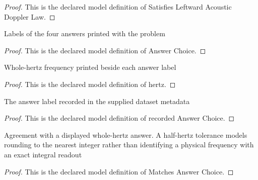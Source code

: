 \begin{proof}
  This is the declared model definition of Satisfies Leftward Acoustic Doppler Law.
\end{proof}
\begin{definition}
  \label{def:physics:phyx-mini-0195:phyxminiproblems-problemphyxmini0195-answerchoice}
  Labels of the four answers printed with the problem
\end{definition}
\begin{proof}
  This is the declared model definition of Answer Choice.
\end{proof}
\begin{definition}[hertz]
  \label{def:physics:phyx-mini-0195:phyxminiproblems-problemphyxmini0195-answerchoice-hertz}
  Whole-hertz frequency printed beside each answer label
\end{definition}
\begin{proof}
  This is the declared model definition of hertz.
\end{proof}
\begin{definition}
  \label{def:physics:phyx-mini-0195:phyxminiproblems-problemphyxmini0195-recordedanswerchoice}
  The answer label recorded in the supplied dataset metadata
\end{definition}
\begin{proof}
  This is the declared model definition of recorded Answer Choice.
\end{proof}
\begin{definition}
  \label{def:physics:phyx-mini-0195:phyxminiproblems-problemphyxmini0195-matchesanswerchoice}
  Agreement with a displayed whole-hertz answer. A half-hertz tolerance models rounding to the nearest integer rather than identifying a physical frequency with an exact integral readout
\end{definition}
\begin{proof}
  This is the declared model definition of Matches Answer Choice.
\end{proof}
